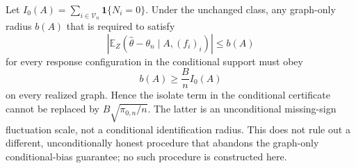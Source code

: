 Let \(I_0(A)=\sum_{i\in\mathcal V_n}\mathbf1\{N_i=0\}\).  Under the unchanged class, any graph-only radius \(b(A)\) that is required to satisfy
\[
 \left|\mathbb E_Z(\widehat\theta-\theta_n\mid A,(f_i)_i)\right|\leq b(A)
\]
for every response configuration in the conditional support must obey
\[
 b(A)\geq \frac{B}{n}I_0(A)
\]
on every realized graph.  Hence the isolate term in the conditional certificate cannot be replaced by \(B\sqrt{\pi_{0,n}/n}\).  The latter is an unconditional missing-sign fluctuation scale, not a conditional identification radius.  This does not rule out a different, unconditionally honest procedure that abandons the graph-only conditional-bias guarantee; no such procedure is constructed here.